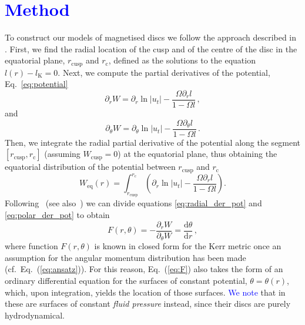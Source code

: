 \documentclass{aa}
\newcommand{\sg}[1]{\textcolor{blue}{#1}}
\begin{document}
\section{\sg{Method}}
\label{methodology}

To construct our models of magnetised discs we follow the approach described in \citet{Qian:2009}. First, we find the radial location of the cusp and of the centre of the disc in the equatorial plane, $r_{\mathrm{cusp}}$ and $r_{\mathrm{c}}$, defined as the solutions to the equation $l(r) - l_{\mathrm{K}} = 0$.
Next, we compute the partial derivatives of the potential, Eq.~\eqref{eq:potential}
\begin{equation}\label{eq:radial_der_pot}
\partial_r W = \partial_r \ln|u_t| - \frac{\Omega \partial_rl}{1 - \Omega l}\,,
\end{equation}
and
\begin{equation}\label{eq:polar_der_pot}
\partial_{\theta} W = \partial_{\theta} \ln|u_t| - \frac{\Omega \partial_{\theta}l}{1 - \Omega l}\,.
\end{equation}
Then, we integrate the radial partial derivative of the potential along the segment $[r_{\mathrm{cusp}}, r_{\mathrm{c}}]$ (assuming $W_{\mathrm{cusp}} = 0$) at the equatorial plane, thus obtaining the equatorial distribution of the potential between $r_{\mathrm{cusp}}$ and $r_{\mathrm{c}}$
\begin{equation}\label{eq:equatorial_pot}
W_{\mathrm{eq}}(r) = \int^{r_{\mathrm{c}}}_{r_{\mathrm{cusp}}}\left(\partial_r \ln|u_t| - \frac{\Omega \partial_rl}{1 - \Omega l}\right).
\end{equation}
Following~\citet{Qian:2009} (see also~\citet{Jaroszynski:1980}) we can divide equations \eqref{eq:radial_der_pot} and \eqref{eq:polar_der_pot} to obtain
\begin{equation}\label{eq:F}
F(r, \theta) = -\frac{\partial_r W}{\partial_{\theta} W} = \frac{\mathrm{d}\theta}{\mathrm{d}r}\,,
\end{equation}
where function $F(r, \theta)$ is known in closed form for the Kerr metric once an assumption for the angular momentum distribution has been made (cf.~Eq.~(\ref{eq:ansatz})). For this reason, Eq.~(\ref{eq:F}) also takes the form of an ordinary differential equation for the surfaces of constant potential, $\theta=\theta(r)$, which, upon integration, yields the location of those surfaces. \sg{We note} that in~\citet{Qian:2009} these are surfaces of constant {\it fluid pressure} instead, since their discs are purely hydrodynamical.
\end{document}
